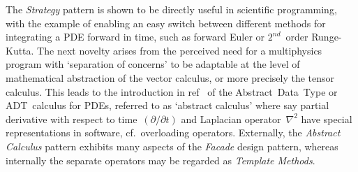 The {\it Strategy} pattern is shown to be directly useful in scientific programming, with the example of
enabling an easy switch between different methods for integrating a PDE forward in time, such as
forward Euler or $2^{nd}$~order Runge-Kutta. The next novelty arises from the perceived need for a
multiphysics program with `separation of concerns' to be adaptable at the level of mathematical abstraction
of the vector calculus, or more precisely the tensor calculus. This leads to the introduction
in ref~\cite[\S\,6]{rousonxiaxu}
of the Abstract~Data~Type or ADT~calculus for PDEs, referred to as `abstract calculus' where say
partial derivative with respect
to time~$(\partial/\partial t)$ and Laplacian operator~$\nabla^2$ have special representations in software,
cf.\ overloading operators. Externally, the {\it Abstract Calculus} pattern exhibits many aspects of the {\it Facade}
design pattern, whereas internally the separate operators may be regarded as {\it Template Methods}.

